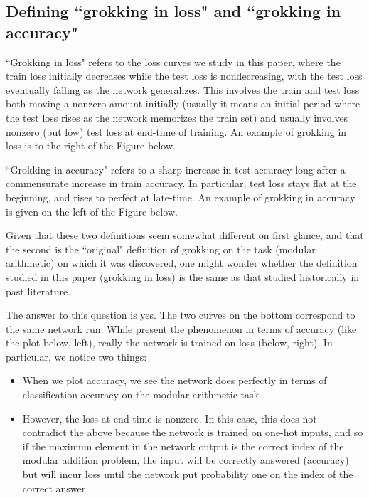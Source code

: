 \documentclass{article} %
\begin{document}
\subsection{Defining ``grokking in loss" and ``grokking in accuracy"}

``Grokking in loss" refers to the loss curves we study in this paper, where the train loss initially decreases while the test loss is nondecreasing, with the test loss eventually falling as the network generalizes. This involves the train and test loss both moving a nonzero amount initially (usually it means an initial period where the test loss rises as the network memorizes the train set) and usually involves nonzero (but low) test loss at end-time of training. An example of grokking in loss is to the right of the Figure below. 

``Grokking in accuracy" refers to a sharp increase in test accuracy long after a commensurate increase in train accuracy. In particular, test loss stays flat at the beginning, and rises to perfect at late-time. An example of grokking in accuracy is given on the left of the Figure below. 

Given that these two definitions seem somewhat different on first glance, and that the second is the ``original" definition of grokking \cite{power2022grokking} on the task (modular arithmetic) on which it was discovered, one might wonder whether the definition studied in this paper (grokking in loss) is the same as that studied historically in past literature. 

The answer to this question is yes. The two curves on the bottom correspond to the same network run. While \cite{power2022grokking} present the phenomenon in terms of accuracy (like the plot below, left), really the network is trained on loss (below, right). In particular, we notice two things: 

\begin{itemize}
    \item When we plot accuracy, we see the network does perfectly in terms of classification accuracy on the modular arithmetic task. 
    \item However, the loss at end-time is nonzero. In this case, this does not contradict the above because the network is trained on one-hot inputs, and so if the maximum element in the network output is the correct index of the modular addition problem, the input will be correctly answered (accuracy) but will incur loss until the network put probability one on the index of the correct answer. 
\end{itemize}
\end{document}
